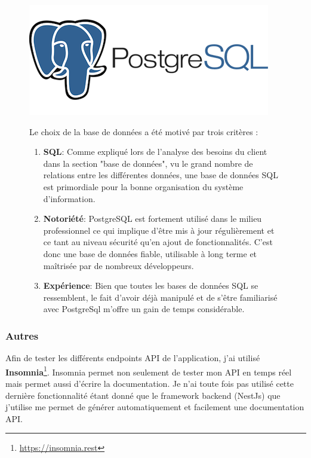 \begin{figure}[H]
  \begin{minipage}{.3\textwidth}
    \includegraphics[width=0.75\linewidth]{img/tech/PostgreSql.png} 
  \end{minipage} 
  \begin{minipage}{.7\textwidth}
    Le choix de la base de données a été motivé par trois critères :
    \begin{enumerate}
      \item \textbf{SQL}: Comme expliqué lors de l'analyse des besoins du client dans la section "base de données", vu le grand nombre de relations entre les différentes données, une base de données SQL est primordiale pour la bonne organisation du système d'information.
      \item \textbf{Notoriété}: PostgreSQL est fortement utilisé dans le milieu professionnel ce qui implique d'être mis à jour régulièrement et ce tant au niveau sécurité qu'en ajout de fonctionnalités. C'est donc une base de données fiable, utilisable à long terme et maîtrisée par de nombreux développeurs.
      \item \textbf{Expérience}: Bien que toutes les bases de données SQL se ressemblent, le fait d'avoir déjà manipulé et de s'être familiarisé avec PostgreSql m'offre un gain de temps considérable.
    \end{enumerate}
  \end{minipage} 
\end{figure}

\subsubsection{Autres}


Afin de tester les différents endpoints API de l'application, j'ai utilisé \textbf{Insomnia}\footnote{\url{https://insomnia.rest}}. Insomnia permet non seulement de tester mon API en temps réel mais permet aussi d'écrire la documentation. Je n'ai toute fois pas utilisé cette dernière fonctionnalité étant donné que le framework backend (NestJs) que j'utilise me permet de générer automatiquement et facilement une documentation API.

